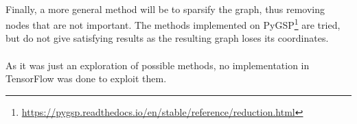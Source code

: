 \documentclass[11pt]{report}
\begin{document}
\paragraph*{}
Finally, a more general method will be to sparsify the graph, thus removing nodes that are not important. The methods implemented on PyGSP\footnote{\url{https://pygsp.readthedocs.io/en/stable/reference/reduction.html}} are tried, but do not give satisfying results as the resulting graph loses its coordinates.

\paragraph*{}
As it was just an exploration of possible methods, no implementation in TensorFlow was done to exploit them.


\end{document}
